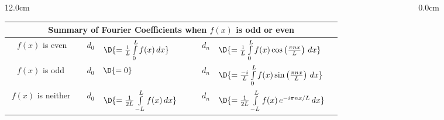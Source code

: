 \begin{frame}
\frametitle{}
\scriptsize
\begin{columns}\begin{column}{12.0cm}
\begin{center}
\setlength{\extrarowheight}{0.1cm}
\begin{tabular}{|p{1.9cm}|cp{-0.1cm}lc|cp{-0.1cm}lc|}
	\hline
	\hline
	\multicolumn{9}{|c|}{\bf Summary of Fourier Coefficients when $f(x)$ is odd or even}\\
	\hline
	\multirow{1}{*}{$\quad f(x)$ is even}
	& & $d_0$ & $\D{= 
	\frac{1}{L}\int \limits_{0}^{L} f(x) \, dx}$ 
	& & & $d_n$ & $\D{= 
	\frac{1}{L}\int \limits_{0}^{L} f(x) \cos\left(\frac{\pi nx}{L}\right)	\,dx}$ & \\
	\hline
	\multirow{1}{*}{$\quad f(x)$ is odd}
	& & $d_0$ & $\D{=  0}$ 
	& & & $d_n$ & $\D{=
	\frac{-i}{L}\int \limits_{0}^{L} f(x) \sin\left(\frac{\pi nx}{L}\right)	\,dx}$ & \\
	\hline
	\multirow{1}{*}{$\,\, f(x)$ is neither}
	& & $d_0$ & $\D{= 
	\frac{1}{2L}\int \limits_{-L}^{L} f(x) \, dx}$ 
	& & & $d_n$ & $\D{= 
	\frac{1}{2L}\int \limits_{-L}^{L} f(x)\, e^{-i\pi nx/L} \, dx}$ & \\
	\hline
	\hline
\end{tabular}
\end{center}

\end{column}\begin{column}{0.0cm}\end{column}\end{columns}
\end{frame}


